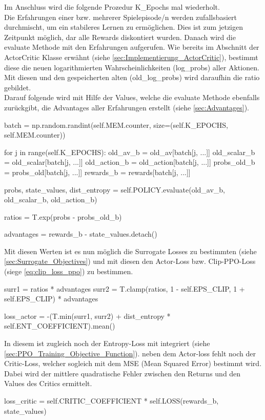 Im Anschluss wird die folgende Prozedur K\_Epochs mal wiederholt.\\
Die Erfahrungen einer bzw. mehrerer Spielepisode/n werden zufallsbasiert durchmischt, um ein stabileres Lernen zu ermöglichen. Dies ist zum jetzigen Zeitpunkt möglich, dar alle Rewards diskontiert wurden. Danach wird die evaluate Methode mit den Erfahrungen aufgerufen. Wie bereits im Abschnitt der ActorCritic Klasse erwähnt (siehe \ref{sec:Implementierung_ActorCritic}), bestimmt diese die neuen logarithmierten Wahrscheinlichkeiten (log\_probs) aller Aktionen. Mit diesen und den gespeicherten alten (old\_log\_probs) wird daraufhin die ratio gebildet.\\
Darauf folgende wird mit Hilfe der Values, welche die evaluate Methode ebenfalls zurückgibt, die Advantages aller Erfahrungen erstellt (siehe \ref{sec:Advantages}).
\begin{python}
	batch = np.random.randint(self.MEM.counter, size=(self.K_EPOCHS, self.MEM.counter))
	
	for j in range(self.K_EPOCHS):
		old_av_b = old_av[batch[j, ...]]
		old_scalar_b = old_scalar[batch[j, ...]]
		old_action_b = old_action[batch[j, ...]]
		probs_old_b = probs_old[batch[j, ...]]
		rewards_b = rewards[batch[j, ...]]
		
		probs, state_values, dist_entropy = self.POLICY.evaluate(old_av_b, old_scalar_b, old_action_b)
		
		ratios = T.exp(probs - probs_old_b)
		
		advantages = rewards_b - state_values.detach()
\end{python}
Mit diesen Werten ist es nun möglich die Surrogate Losses zu bestimmten (siehe \ref{sec:Surrogate_Objectives}) und mit diesen den Actor-Loss bzw. Clip-PPO-Loss (siege \ref{eq:clip_loss_ppo}) zu bestimmen.
\begin{python}
	surr1 = ratios * advantages
	surr2 = T.clamp(ratios, 1 - self.EPS_CLIP, 1 + self.EPS_CLIP) * advantages
	
	loss_actor = -(T.min(surr1, surr2) + dist_entropy * self.ENT_COEFFICIENT).mean()
\end{python}
In diesem ist zugleich noch der Entropy-Loss mit integriert (siehe \ref{sec:PPO_Training_Objective_Function}).
neben dem Actor-loss fehlt noch der Critic-Loss, welcher sogleich mit dem MSE (Mean Squared Error) bestimmt wird. Dabei wird der mittlere quadratische Fehler zwischen den Returns und den Values des Critics ermittelt.
\begin{python}
	loss_critic = self.CRITIC_COEFFICIENT * self.LOSS(rewards_b, state_values)
\end{python}
